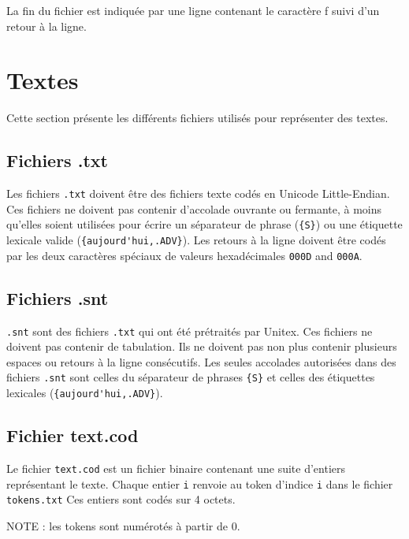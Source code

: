 \bigskip
\noindent La fin du fichier est indiquée par une ligne contenant le caractère f suivi d’un retour à la ligne.




\section{Textes}
Cette section présente les différents fichiers utilisés pour représenter des textes.
\subsection{Fichiers .txt}
\label{section-texts}
Les fichiers \verb+.txt+ doivent être des fichiers texte codés en Unicode Little-Endian. Ces
fichiers ne doivent pas contenir d’accolade ouvrante ou fermante, à moins qu’elles soient utilisées
pour écrire un séparateur de phrase (\verb+{S}+) ou une étiquette lexicale valide
(\verb+{aujourd'hui,.ADV}+). Les retours à la ligne doivent être codés par les deux caractères
spéciaux de valeurs hexadécimales \verb+000D+ and \verb+000A+.


\subsection{Fichiers .snt}
\verb+.snt+ sont des fichiers \verb+.txt+ qui ont été prétraités par Unitex. Ces fichiers ne doivent
pas contenir de tabulation. Ils ne doivent pas non plus contenir plusieurs espaces ou retours à la
ligne consécutifs. Les seules accolades autorisées dans des fichiers \verb+.snt+ sont celles du
séparateur de phrases \verb+{S}+ et celles des
étiquettes lexicales (\verb+{aujourd'hui,.ADV}+).


\subsection{Fichier text.cod}
Le fichier \verb+text.cod+ est un fichier binaire contenant une suite d’entiers représentant le
texte. Chaque entier \verb+i+ renvoie au token d’indice \verb+i+ dans le fichier \verb+tokens.txt+                          Ces entiers sont codés sur 4 octets.


\bigskip
\noindent NOTE : les tokens sont numérotés à partir de 0.

